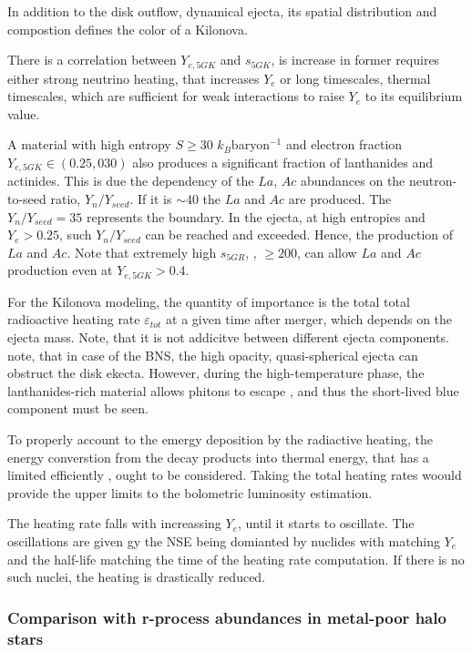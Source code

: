 In addition to the disk outflow, dynamical ejecta, its spatial distribution and compostion defines the color of a Kilonova. 

There is a correlation between $Y_{e, 5GK}$ and $s_{5GK}$, is increase in former requires either strong neutrino heating, that increases $Y_e$ or long timescales, thermal timescales, which are sufficient for weak interactions to raise $Y_e$ to its equilibrium value.

A material with high entropy $S\geq30$ $k_B$baryon$^{-1}$ and electron fraction $Y_{e,5GK}\in(0.25,030)$ also produces a significant fraction of lanthanides and actinides. This is due the dependency of the $La$, $Ac$ abundances on the neutron-to-seed ratio, $Y_n/Y_{seed}$. If it is $\sim40$ the $La$ and $Ac$ are produced. The $Y_n/Y_{seed}=35$ represents the boundary. In the ejecta, at high entropies and $Y_e>0.25$, such $Y_n/Y_{seed}$ can be reached and exceeded. Hence, the production of $La$ and $Ac$. Note that extremely high $s_{5GR}$, \eg, $\geq 200$, can allow $La$ and $Ac$ production even at $Y_{e,5GK}>0.4$. 

For the Kilonova modeling, the quantity of importance is the total total radioactive heating rate $\varepsilon_{tot}$ at a given time after merger, which depends on the ejecta mass. Note, that it is not addicitve between different ejecta components. note, that in case of the \ac{BNS}, the high opacity, quasi-spherical ejecta \cite{(e.g., Hotokezaka et al.,2013b)} can obstruct the disk ekecta. However, during the high-temperature phase, the lanthanides-rich material allows phitons to escape \cite{(Barnes and Kasen, 2013; Fernandez et al., 2017)}, and thus the short-lived blue component must be seen.

To properly account to the emergy deposition by the radiactive heating, the energy converstion from the decay products into thermal energy, that has a limited efficiently \cite{(e.g., Metzger et al., 2010; Hotokezaka et al., 2016; Barnes et al., 2016)}, ought to be considered. Taking the total heating rates woould provide the upper limits to the bolometric luminosity estimation. 

The heating rate falls with increassing $Y_e$, until it starts to oscillate. The oscillations are given gy the NSE being domianted by nuclides with matching $Y_e$ and the half-life matching the time of the heating rate computation. If there is no such nuclei, the heating is drastically reduced. 


\subsubsection{Comparison with r-process abundances in metal-poor halo stars}

